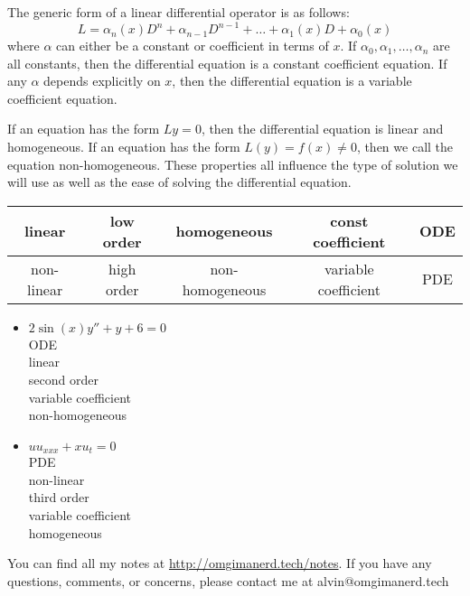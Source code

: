 \documentclass{math}
\begin{document}
The generic form of a linear differential operator is as follows:
\[ L = \alpha_n(x)D^n+\alpha_{n-1}D^{n-1}+\dots+\alpha_1(x)D+\alpha_0(x) \]
where \( \alpha \) can either be a constant or coefficient in terms of \( x \).
If \( \alpha_0,\alpha_1,\dots,\alpha_n \) are all constants, then the
differential equation is a constant coefficient equation. If any \( \alpha \)
depends explicitly on \( x \), then the differential equation is a variable
coefficient equation. \par
If an equation has the form \( Ly = 0 \), then the differential equation is
linear and homogeneous. If an equation has the form \( L(y) = f(x) \ne 0 \),
then we call the equation non-homogeneous. These properties all influence the
type of solution we will use as well as the ease of solving the differential
equation.
\begin{center}
  \begin{tabular}{|c|c|c|c|c|}
    \hline
    linear & low order & homogeneous & const coefficient & ODE \\
    \hline
    non-linear & high order & non-homogeneous & variable coefficient & PDE \\
    \hline
  \end{tabular}
\end{center}
\begin{itemize}
  \item \( 2\sin(x)y''+y+6 = 0 \) \\
    ODE \\
    linear \\
    second order \\
    variable coefficient \\
    non-homogeneous
  \item \( uu_{xxx}+xu_t = 0 \) \\
    PDE \\
    non-linear \\
    third order \\
    variable coefficient \\
    homogeneous
\end{itemize}

\begin{center}
  You can find all my notes at \url{http://omgimanerd.tech/notes}. If you have
  any questions, comments, or concerns, please contact me at
  alvin@omgimanerd.tech
\end{center}
\end{document}
